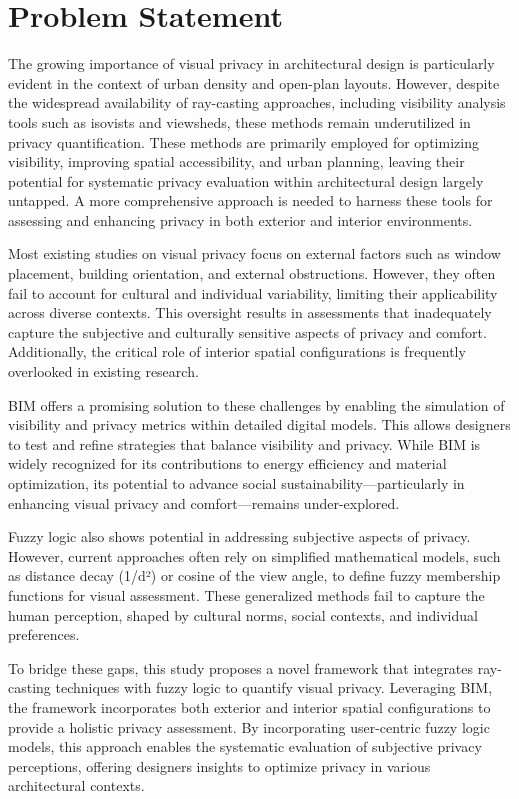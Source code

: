 \documentclass[final,3p,times,review]{elsarticle}
\begin{document}
\section{Problem Statement}
The growing importance of visual privacy in architectural design is particularly evident in the context of urban density and open-plan layouts. However, despite the widespread availability of ray-casting approaches, including visibility analysis tools such as isovists and viewsheds, these methods remain underutilized in privacy quantification. These methods are primarily employed for optimizing visibility, improving spatial accessibility, and urban planning, leaving their potential for systematic privacy evaluation within architectural design largely untapped. A more comprehensive approach is needed to harness these tools for assessing and enhancing privacy in both exterior and interior environments.

Most existing studies on visual privacy focus on external factors such as window placement, building orientation, and external obstructions. However, they often fail to account for cultural and individual variability, limiting their applicability across diverse contexts. This oversight results in assessments that inadequately capture the subjective and culturally sensitive aspects of privacy and comfort. Additionally, the critical role of interior spatial configurations is frequently overlooked in existing research. 

BIM offers a promising solution to these challenges by enabling the simulation of visibility and privacy metrics within detailed digital models. This allows designers to test and refine strategies that balance visibility and privacy. While BIM is widely recognized for its contributions to energy efficiency and material optimization, its potential to advance social sustainability—particularly in enhancing visual privacy and comfort—remains under-explored.

Fuzzy logic also shows potential in addressing subjective aspects of privacy. However, current approaches often rely on simplified mathematical models, such as distance decay (1/d²) or cosine of the view angle, to define fuzzy membership functions for visual assessment. These generalized methods fail to capture the human perception, shaped by cultural norms, social contexts, and individual preferences.

To bridge these gaps, this study proposes a novel framework that integrates ray-casting techniques with fuzzy logic to quantify visual privacy. Leveraging BIM, the framework incorporates both exterior and interior spatial configurations to provide a holistic privacy assessment. By incorporating user-centric fuzzy logic models, this approach enables the systematic evaluation of subjective privacy perceptions, offering designers insights to optimize privacy in various architectural contexts.
\end{document}
